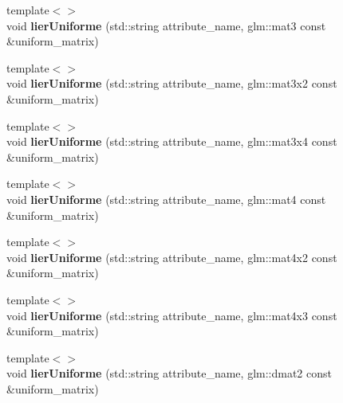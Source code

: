 \begin{DoxyCompactItemize}
\item 
\hypertarget{classopengl_1_1_programme_a9fcb45e6142abed238e1e9fb7e4210f8}{}{\footnotesize template$<$$>$ }\\void {\bfseries lier\+Uniforme} (std\+::string attribute\+\_\+name, glm\+::mat3 const \&uniform\+\_\+matrix)\label{classopengl_1_1_programme_a9fcb45e6142abed238e1e9fb7e4210f8}

\item 
\hypertarget{classopengl_1_1_programme_a8399612fa889f320842c5f0460d926e9}{}{\footnotesize template$<$$>$ }\\void {\bfseries lier\+Uniforme} (std\+::string attribute\+\_\+name, glm\+::mat3x2 const \&uniform\+\_\+matrix)\label{classopengl_1_1_programme_a8399612fa889f320842c5f0460d926e9}

\item 
\hypertarget{classopengl_1_1_programme_a5e8909ed134d9bef174142ae95393fbe}{}{\footnotesize template$<$$>$ }\\void {\bfseries lier\+Uniforme} (std\+::string attribute\+\_\+name, glm\+::mat3x4 const \&uniform\+\_\+matrix)\label{classopengl_1_1_programme_a5e8909ed134d9bef174142ae95393fbe}

\item 
\hypertarget{classopengl_1_1_programme_a43efe3f1b27560a42db5360eaaf66fad}{}{\footnotesize template$<$$>$ }\\void {\bfseries lier\+Uniforme} (std\+::string attribute\+\_\+name, glm\+::mat4 const \&uniform\+\_\+matrix)\label{classopengl_1_1_programme_a43efe3f1b27560a42db5360eaaf66fad}

\item 
\hypertarget{classopengl_1_1_programme_a3a80fa0504bcf24af07534f2f516fc39}{}{\footnotesize template$<$$>$ }\\void {\bfseries lier\+Uniforme} (std\+::string attribute\+\_\+name, glm\+::mat4x2 const \&uniform\+\_\+matrix)\label{classopengl_1_1_programme_a3a80fa0504bcf24af07534f2f516fc39}

\item 
\hypertarget{classopengl_1_1_programme_a82a519a15286431c9b8f761c6c43347e}{}{\footnotesize template$<$$>$ }\\void {\bfseries lier\+Uniforme} (std\+::string attribute\+\_\+name, glm\+::mat4x3 const \&uniform\+\_\+matrix)\label{classopengl_1_1_programme_a82a519a15286431c9b8f761c6c43347e}

\item 
\hypertarget{classopengl_1_1_programme_a155dd5cf516378ca8e9690edbbb7b263}{}{\footnotesize template$<$$>$ }\\void {\bfseries lier\+Uniforme} (std\+::string attribute\+\_\+name, glm\+::dmat2 const \&uniform\+\_\+matrix)\label{classopengl_1_1_programme_a155dd5cf516378ca8e9690edbbb7b263}


\end{DoxyCompactItemize}
